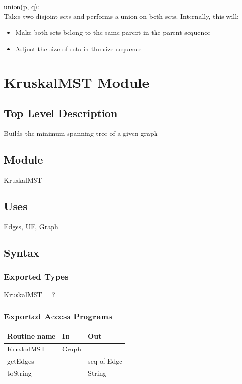 \documentclass[12pt]{article}
\begin{document}
\noindent
union(p, q):\\
Takes two disjoint sets and performs a union on both sets. Internally, this will:
\begin{itemize}
\item Make both sets belong to the same parent in the parent sequence
\item Adjust the size of sets in the size sequence
\end{itemize}

\newpage


\section*{KruskalMST Module}

\subsection* {Top Level Description}

Builds the minimum spanning tree of a given graph

\subsection*{Module}

KruskalMST

\subsection* {Uses}

Edges, UF, Graph

\subsection* {Syntax}

\subsubsection* {Exported Types}

KruskalMST = ?

\subsubsection* {Exported Access Programs}

\begin{tabular}{| l | l | l |}
\hline
\textbf{Routine name} & \textbf{In} & \textbf{Out}\\
\hline
KruskalMST & Graph & ~ \\
\hline
getEdges & ~ & seq of Edge \\
\hline
toString & ~ & String\\
\hline
\end{tabular}
\end{document}
